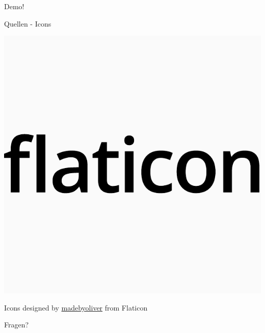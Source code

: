 \documentclass{beamer}
\begin{document}
  
  \begin{frame}[standout]
  	Demo!
  \end{frame}
  
  \begin{frame}{Quellen - Icons}
  	\begin{center}
  		\includegraphics[width=.5\textwidth]{bilder/flaticon.pdf}
  		
  		\vspace{-40pt}
  		
  		Icons designed by \href{http://www.flaticon.com/authors/madebyoliver}{madebyoliver} from Flaticon 
  	\end{center}
  \end{frame}
    
  \begin{frame}[standout]
  	Fragen?
  \end{frame}
  
\end{document}
